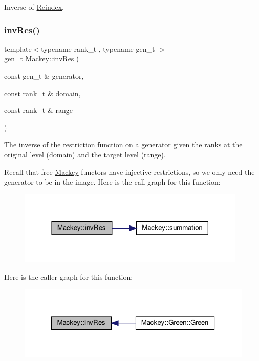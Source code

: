 Inverse of \hyperlink{namespaceMackey_a7da73ade3ee83c4ffd614e79242d7c04}{Reindex}. 

\mbox{\label{namespaceMackey_a30b5667e411ff694aa989e95e394bb41}} 
\subsubsection{\texorpdfstring{inv\+Res()}{invRes()}}
{\footnotesize\ttfamily template$<$typename rank\+\_\+t , typename gen\+\_\+t $>$ \\
gen\+\_\+t Mackey\+::inv\+Res (\begin{DoxyParamCaption}\item[{const gen\+\_\+t \&}]{generator,  }\item[{const rank\+\_\+t \&}]{domain,  }\item[{const rank\+\_\+t \&}]{range }\end{DoxyParamCaption})}

The inverse of the restriction function on a generator given the ranks at the original level (domain) and the target level (range).

Recall that free \hyperlink{namespaceMackey}{Mackey} functors have injective restrictions, so we only need the generator to be in the image. Here is the call graph for this function\+:\nopagebreak
\begin{figure}[H]
\begin{center}
\leavevmode
\includegraphics[width=309pt]{namespaceMackey_a30b5667e411ff694aa989e95e394bb41_cgraph}
\end{center}
\end{figure}
Here is the caller graph for this function\+:\nopagebreak
\begin{figure}[H]
\begin{center}
\leavevmode
\includegraphics[width=320pt]{namespaceMackey_a30b5667e411ff694aa989e95e394bb41_icgraph}
\end{center}
\end{figure}
\mbox{\label{namespaceMackey_a782d9ce52543c3ae3520b4859dda3240}} 
